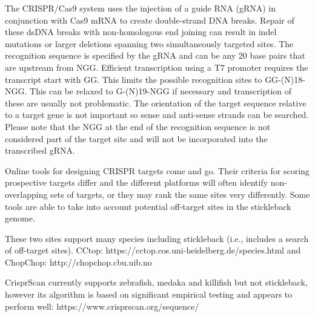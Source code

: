 \documentclass[
  letterpaper,
  DIV=11,
  numbers=noendperiod]{scrreprt}
\begin{document}
\begin{tcolorbox}[enhanced jigsaw, toprule=.15mm, breakable, coltitle=black, leftrule=.75mm, title=\textcolor{quarto-callout-note-color}{\faInfo}\hspace{0.5em}{Note}, bottomrule=.15mm, toptitle=1mm, bottomtitle=1mm, colframe=quarto-callout-note-color-frame, opacityback=0, colback=white, opacitybacktitle=0.6, colbacktitle=quarto-callout-note-color!10!white, rightrule=.15mm, titlerule=0mm, arc=.35mm, left=2mm]

The CRISPR/Cas9 system uses the injection of a guide RNA (gRNA) in
conjunction with Cas9 mRNA to create double-strand DNA breaks. Repair of
these dsDNA breaks with non-homologous end joining can result in indel
mutations or larger deletions spanning two simultaneously targeted
sites. The recognition sequence is specified by the gRNA and can be any
20 base pairs that are upstream from NGG. Efficient transcription using
a T7 promoter requires the transcript start with GG. This limits the
possible recognition sites to GG-(N)18-NGG. This can be relaxed to
G-(N)19-NGG if necessary and transcription of these are usually not
problematic. The orientation of the target sequence relative to a target
gene is not important so sense and anti-sense strands can be searched.
Please note that the NGG at the end of the recognition sequence is not
considered part of the target site and will not be incorporated into the
transcribed gRNA.

Online tools for designing CRISPR targets come and go. Their criteria
for scoring prospective targets differ and the different platforms will
often identify non-overlapping sets of targets, or they may rank the
same sites very differently. Some tools are able to take into account
potential off-target sites in the stickleback genome.

These two sites support many species including stickleback (i.e.,
includes a search of off-target sites). CCtop:
https://cctop.cos.uni-heidelberg.de/species.html and ChopChop:
http://chopchop.cbu.uib.no

CrisprScan currently supports zebrafish, medaka and killifish but not
stickleback, however its algorithm is based on significant empirical
testing and appears to perform well:
https://www.crisprscan.org/sequence/

\end{tcolorbox}
\end{document}
